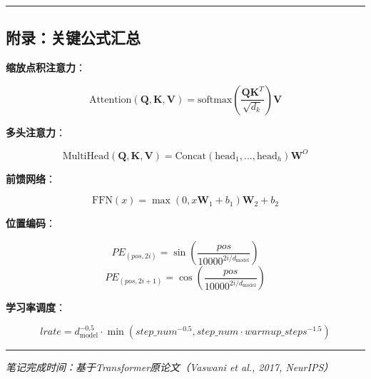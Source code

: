\documentclass[11pt,a4paper]{article}
\begin{document}
\vspace{0.5em}\noindent\rule{\textwidth}{0.4pt}\vspace{0.5em}

\subsection*{附录：关键公式汇总}

\textbf{缩放点积注意力}：

\[
\text{Attention}(\mathbf{Q}, \mathbf{K}, \mathbf{V}) = \text{softmax}\left(\frac{\mathbf{Q}\mathbf{K}^T}{\sqrt{d_k}}\right)\mathbf{V}
\]

\textbf{多头注意力}：

\[
\text{MultiHead}(\mathbf{Q}, \mathbf{K}, \mathbf{V}) = \text{Concat}(\text{head}_1, ..., \text{head}_h)\mathbf{W}^O
\]

\textbf{前馈网络}：

\[
\text{FFN}(x) = \max(0, x\mathbf{W}_1 + b_1)\mathbf{W}_2 + b_2
\]

\textbf{位置编码}：

\[
PE_{(pos, 2i)} = \sin\left(\frac{pos}{10000^{2i/d_{\text{model}}}}\right)
\]
\[
PE_{(pos, 2i+1)} = \cos\left(\frac{pos}{10000^{2i/d_{\text{model}}}}\right)
\]

\textbf{学习率调度}：

\[
lrate = d_{\text{model}}^{-0.5} \cdot \min\left(step\_num^{-0.5}, step\_num \cdot warmup\_steps^{-1.5}\right)
\]

\vspace{0.5em}\noindent\rule{\textwidth}{0.4pt}\vspace{0.5em}

\textit{笔记完成时间：基于Transformer原论文（Vaswani et al., 2017, NeurIPS）}
\end{document}
